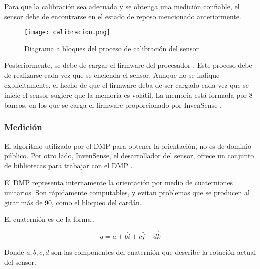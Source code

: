 Para que la calibración sea adecuada y se obtenga una medición confiable, el sensor debe de encontrarse en el estado de reposo mencionado anteriormente.

\begin{figure}[htb]
	\centering
	\texttt{[image: calibracion.png]}
	\caption{Diagrama a bloques del proceso de calibración del sensor}
	\label{fig:calibracion}
\end{figure}

\newpage
Posteriormente, se debe de cargar el firmware del procesador \cite{userguideMotionDriver}. Este proceso debe de realizarse cada vez que se encienda el sensor. Aunque no se indique explícitamente, el hecho de que el firmware deba de ser cargado cada vez que se inicie el sensor sugiere que la memoria es volátil. La memoria está formada por 8 bancos, en los que se carga el firmware proporcionado por InvenSense \cite{userguideMotionDriver}. 

\subsubsection{Medición}

El algoritmo utilizado por el DMP para obtener la orientación, no es de dominio público. Por otro lado, InvenSense, el desarrollador del sensor, ofrece un conjunto de bibliotecas para trabajar con el DMP \cite{userguideMotionDriver}.



El DMP representa internamente la orientación por medio de cuaterniones unitarios. Son rápidamente computables, y evitan problemas que se producen al girar más de 90\degree, como el bloqueo del cardán.

El cuaternión es de la forma:.

\begin{equation}
	q = a + b\hat{i} + c\hat{j} + d\hat{k}
	\label{eq:eqcuaternion}
\end{equation}

Donde $a, b, c, d$ son las componentes del cuaternión que describe la rotación actual del sensor.

